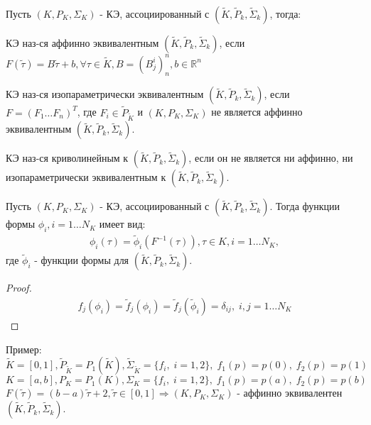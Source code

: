 \documentclass[__main__.tex]{subfiles}
\begin{document}
Пусть $(K,P_K,\Sigma_K)$ - КЭ, ассоциированный с $\left(\tilde{K},\tilde{P}_k,\tilde{\Sigma}_k\right)$, тогда:
\begin{definition}
	КЭ наз-ся аффинно эквивалентным $\left(\tilde{K},\tilde{P}_k,\tilde{\Sigma}_k\right)$, если $F(\tilde{\tau})=B\tilde{\tau}+b,\forall\tau\in\tilde{K},B=(B^i_j)^n_n,b\in\mathbb{R}^n$
\end{definition}
\begin{definition}
	КЭ наз-ся изопараметрически эквивалентным $\left(\tilde{K},\tilde{P}_k,\tilde{\Sigma}_k\right)$, если $F=(F_1\dots F_n)^T$, где $F_i\in\tilde{P}_{\tilde{K}}$ и $(K,P_K,\Sigma_K)$ не является аффинно эквивалентным $\left(\tilde{K},\tilde{P}_k,\tilde{\Sigma}_k\right)$.
\end{definition}
\begin{definition}[Криволинейный КЭ]
	КЭ наз-ся криволинейным к $\left(\tilde{K},\tilde{P}_k,\tilde{\Sigma}_k\right)$, если он не является ни аффинно, ни изопараметрически эквивалентным к $\left(\tilde{K},\tilde{P}_k,\tilde{\Sigma}_k\right)$.
\end{definition}
\begin{theorem}
	Пусть $(K,P_K,\Sigma_K)$ - КЭ, ассоциированный с $\left(\tilde{K},\tilde{P}_k,\tilde{\Sigma}_k\right)$. Тогда функции формы $\phi_i,i=1\dots N_K$ имеет вид:
	\begin{gather*}
		\phi_i(\tau)=\tilde{\phi}_i(F^{-1}(\tau)),\tau\in K,i=1\dots N_K,
	\end{gather*}
	где $\tilde{\phi}_i$ - функции формы для $\left(\tilde{K},\tilde{P}_k,\tilde{\Sigma}_k\right)$.
\end{theorem}
\begin{proof}
	\begin{gather*}
		f_j(\phi_i)=\tilde{f}_j(\phi_i)=\tilde{f}_j(\tilde{\phi}_i)=\delta_{ij},\;i,j=1\dots N_K
	\end{gather*}
\end{proof}
Пример:\\
$\tilde{K}=[0,1],\tilde{P}_{\tilde{K}}=P_1(\tilde{K}),\tilde{\Sigma}_{\tilde{K}}=\{f_i,\;i=1,2 \},\;f_1(p)=p(0),\;f_2(p)=p(1)$\\
$K=[a,b],P_K=P_1(K),\Sigma_K=\{f_i,\;i=1,2 \},\;f_1(p)=p(a),\;f_2(p)=p(b)$\\
$F(\tilde{\tau})=(b-a)\tilde{\tau}+2,\tilde{\tau}\in[0,1]\Rightarrow(K,P_K,\Sigma_K)$ - аффинно эквивалентен $\left(\tilde{K},\tilde{P}_k,\tilde{\Sigma}_k\right)$.
\end{document}
